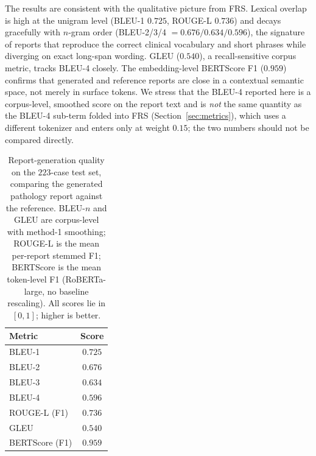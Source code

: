 \documentclass[11pt]{article}
\begin{document}
The results are consistent with the qualitative picture from FRS. Lexical overlap
is high at the unigram level (BLEU-1 $0.725$, ROUGE-L $0.736$) and decays
gracefully with $n$-gram order (BLEU-2/3/4 $=0.676/0.634/0.596$), the signature of
reports that reproduce the correct clinical vocabulary and short phrases while
diverging on exact long-span wording. GLEU ($0.540$), a recall-sensitive
corpus metric, tracks BLEU-4 closely. The embedding-level BERTScore F1 ($0.959$)
confirms that generated and reference reports are close in a contextual semantic
space, not merely in surface tokens. We stress that the BLEU-4 reported here is a
corpus-level, smoothed score on the report text and is \emph{not} the same
quantity as the BLEU-4 sub-term folded into FRS (Section~\ref{sec:metrics}), which
uses a different tokenizer and enters only at weight $0.15$; the two numbers
should not be compared directly.

\begin{table}[t]
\centering
\caption{Report-generation quality on the $223$-case test set, comparing the
generated pathology report against the reference. BLEU-$n$ and GLEU are
corpus-level with method-1 smoothing; ROUGE-L is the mean per-report stemmed F1;
BERTScore is the mean token-level F1 (RoBERTa-large, no baseline rescaling). All
scores lie in $[0,1]$; higher is better.}
\label{tab:reportgen}
\begin{tabular}{lc}
\toprule
\textbf{Metric} & \textbf{Score}\\
\midrule
BLEU-1          & $0.725$\\
BLEU-2          & $0.676$\\
BLEU-3          & $0.634$\\
BLEU-4          & $0.596$\\
ROUGE-L (F1)    & $0.736$\\
GLEU            & $0.540$\\
BERTScore (F1)  & $0.959$\\
\bottomrule
\end{tabular}
\end{table}
\end{document}
